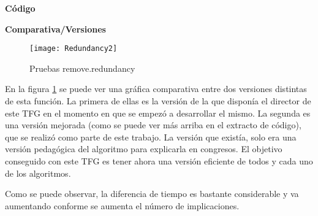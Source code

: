 \newpage
\textbf{C\'odigo} 

\newpage
 
\textbf{Comparativa/Versiones} 
\begin{figure}[h]
    \centering
    \texttt{[image: Redundancy2]}
    \caption{Pruebas remove.redundancy}
    \label{fig:redundancy}
\end{figure} 

En la figura \ref{fig:redundancy} se puede ver una gr\'afica comparativa entre dos versiones distintas de esta funci\'on. La primera de ellas es la versi\'on de la que dispon\'ia el director de este TFG en el momento en que se empez\'o a desarrollar el mismo. La segunda es una versi\'on mejorada (como se puede ver m\'as arriba en el extracto de c\'odigo), que se realiz\'o como parte de este trabajo. La versi\'on que exist\'ia, solo era una versi\'on pedag\'ogica del algoritmo para explicarla en congresos. El objetivo conseguido con este TFG es tener ahora una versi\'on eficiente de todos y cada uno de los algoritmos. 


Como se puede observar, la diferencia de tiempo es bastante considerable y va aumentando conforme se aumenta el n\'umero de implicaciones.